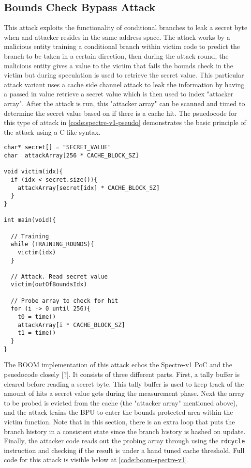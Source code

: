 \subsection{Bounds Check Bypass Attack}

This attack exploits the functionality of conditional branches to leak a secret byte 
when and attacker resides in the same address space. The attack works by a 
malicious entity training a conditional branch within victim code to predict the branch
to be taken in a certain direction, then during the attack round, the malicious entity
gives a value to the victim that fails the bounds check in the victim but during
speculation is used to retrieve the secret value. This particular attack variant
uses a cache side channel attack to leak the information by having a passed in value retrieve
a secret value which is then used to index "attacker array". After the attack is run, this 
"attacker array" can be scanned and timed to determine the secret value based on if there
is a cache hit. The psuedocode for this type of attack in \ref{code:spectre-v1-pseudo}
demonstrates the basic principle of the attack using a C-like syntax.

\begin{lstlisting}[style=column-code, caption=Psuedocode of Bounds Check Bypass Attack]
char* secret[] = "SECRET_VALUE"
char  attackArray[256 * CACHE_BLOCK_SZ]

void victim(idx){
  if (idx < secret.size()){
    attackArray[secret[idx] * CACHE_BLOCK_SZ]
  }
}

int main(void){
  
  // Training
  while (TRAINING_ROUNDS){
    victim(idx)
  }

  // Attack. Read secret value
  victim(outOfBoundsIdx)

  // Probe array to check for hit
  for (i -> 0 until 256){
    t0 = time()
    attackArray[i * CACHE_BLOCK_SZ]
    t1 = time()
  }
}
\end{lstlisting}\label{code:spectre-v1-pseudo}


The BOOM implementation of this attack echos the Spectre-v1 PoC and the psuedocode closely [?].
It consists of three different parts. First, a tally buffer is cleared before reading a secret byte.
This tally buffer is used to keep track of the amount of hits a secret value gets during the measurement
phase. Next the array to be probed is evicted from the cache (the "attacker array" mentioned above), and
the attack trains the BPU to enter the bounds protected area within the victim function. Note that in
this section, there is an extra loop that puts the branch history in a consistent state since the branch
history is hashed on update. Finally, the attacker code reads out the probing array through using the
{\tt rdcycle} instruction and checking if the result is under a hand tuned cache threshold. Full code for 
this attack is visible below at \ref{code:boom-spectre-v1}.

